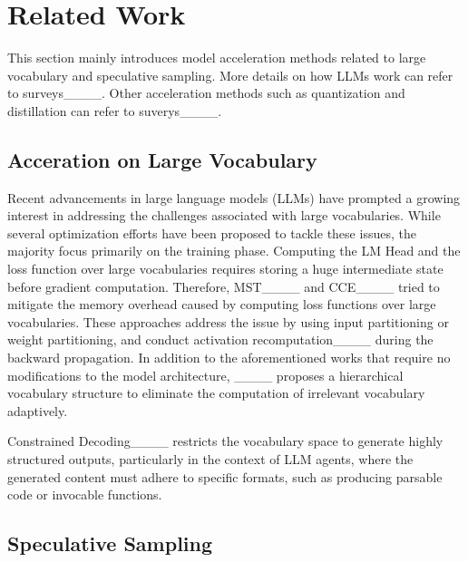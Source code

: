 \section{Related Work}
\label{sec:relate}

This section mainly introduces model acceleration methods related to large vocabulary and speculative sampling. More details on how LLMs work can refer to surveys____. Other acceleration methods such as quantization and distillation can refer to suverys____.

\subsection{Acceration on Large Vocabulary}
Recent advancements in large language models (LLMs) have prompted a growing interest in addressing the challenges associated with large vocabularies. While several optimization efforts have been proposed to tackle these issues, the majority focus primarily on the training phase.
Computing the LM Head and the loss function over large vocabularies requires storing a huge intermediate state before gradient computation. Therefore, MST____ and CCE____ tried to mitigate the memory overhead caused by computing loss functions over large vocabularies. These approaches address the issue by using input partitioning or weight partitioning, and conduct activation recomputation____ during the backward propagation.
In addition to the aforementioned works that require no modifications to the model architecture, ____ proposes a hierarchical vocabulary structure to eliminate the computation of irrelevant vocabulary adaptively.

Constrained Decoding____ restricts the vocabulary space to generate highly structured outputs, particularly in the context of LLM agents, where the generated content must adhere to specific formats, such as producing parsable code or invocable functions.

\subsection{Speculative Sampling}

